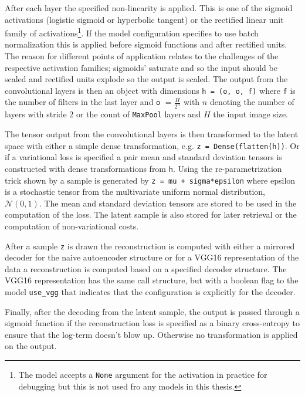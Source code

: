 After each layer the specified non-linearity is applied. This is one of the sigmoid activations (logistic sigmoid or hyperbolic tangent) or the rectified linear unit family of activations\footnote{The model accepts a \lstinline{None} argument for the activation in practice for debugging but this is not used fro any models in this thesis.}. If the model configuration specifies to use batch normalization this is applied before sigmoid functions and after rectified units. The reason for different points of application relates to the challenges of the respective activation families; sigmoids' saturate and so the input should be scaled and rectified units explode so the output is scaled. The output from the convolutional layers is then an object with dimensions \lstinline{h = (o, o, f)} where \lstinline{f} is the number of filters in the last layer and \lstinline{o} $= \frac{H}{2^n}$ with $n$ denoting the number of layers with stride $2$ or the count of \lstinline{MaxPool} layers and $H$ the input image size.

The tensor output from the convolutional layers is then transformed to the latent space with either a simple dense transformation, e.g. \lstinline{z = Dense(flatten(h))}. Or if a variational loss is specified a pair mean and standard deviation tensors is constructed with dense transformations from \lstinline{h}. Using the re-parametrization trick shown by \citet{Kingma2013} a sample is generated by \lstinline{z = mu + sigma*epsilon} where epsilon is a stochastic tensor from the multivariate uniform normal distribution, $\mathcal{N}(0, 1)$. The mean and standard deviation tensors are stored to be used in the computation of the loss. The latent sample is also stored for later retrieval or the computation of non-variational costs. 

After a sample \lstinline{z} is drawn the reconstruction is computed with either a mirrored decoder for the naive autoencoder structure or for a VGG16 representation of the data a reconstruction is computed based on a specified decoder structure. The VGG16 representation has the same call structure, but with a boolean flag to the model \lstinline{use_vgg} that indicates that the configuration is explicitly for the decoder. 

Finally, after the decoding from the latent sample, the output is passed through a sigmoid function if the reconstruction loss is specified as a binary cross-entropy to ensure that the log-term doesn't blow up. Otherwise no transformation is applied on the output. 

